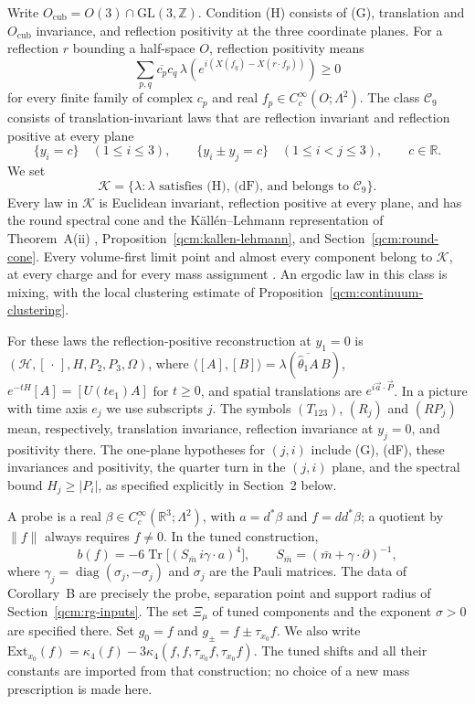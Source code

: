 \documentclass[11pt,letterpaper,reqno]{amsart}
\theoremstyle{definition}
\begin{document}
Write $O_{\mathrm{cub}}=O(3)\cap\mathrm{GL}(3,\mathbb Z)$.
Condition (H) consists of (G), translation and $O_{\mathrm{cub}}$
invariance, and reflection positivity at the three coordinate planes.
For a reflection $r$ bounding a half-space $O$, reflection positivity
means
\begin{equation}\label{qcm:reflection-positivity}
 \sum_{p,q}\overline{c_p}c_q\,
 \lambda\!\left(e^{i(X(f_q)-X(r\cdot f_p))}\right)\ge0
\end{equation}
for every finite family of complex $c_p$ and real
$f_p\in C_c^\infty(O;\Lambda^2)$.
The class $\mathcal C_9$ consists of translation-invariant laws that
are reflection invariant and reflection positive at every plane
\[
 \{y_i=c\}\quad(1\le i\le3),\qquad
 \{y_i\pm y_j=c\}\quad(1\le i<j\le3),\qquad c\in\mathbb R.
\]
We set
\[
\mathcal K=\{\lambda:\lambda\text{ satisfies (H), (dF), and belongs to }\mathcal C_9\}.
\]
Every law in $\mathcal K$ is Euclidean invariant, reflection positive
at every plane, and has the round spectral cone and the
K\"all\'en--Lehmann representation of Theorem~A(ii)
\cite[Propositions~7.1--7.3, Section~7.3, and Theorem~8.6]{QEDConstruction}, Proposition~\ref{qcm:kallen-lehmann}, and Section~\ref{qcm:round-cone}.
Every volume-first limit point and almost every component belong to
$\mathcal K$, at every charge and for every mass assignment
\cite[Section~6, Section~7.5, and Theorem~8.6]{QEDConstruction}. An ergodic law in this class is mixing, with
the local clustering estimate of Proposition~\ref{qcm:continuum-clustering}.

For these laws the reflection-positive reconstruction at $y_1=0$ is
$(\mathcal H,[\,\cdot\,],H,P_2,P_3,\Omega)$, where
$\langle[A],[B]\rangle=\lambda(\overline{\widehat\theta_1A}\,B)$,
$e^{-tH}[A]=[U(te_1)A]$ for $t\ge0$, and spatial translations are
$e^{i\vec a\cdot\vec P}$. In a picture with time axis $e_j$ we use
subscripts $j$. The symbols $(T_{123})$, $(R_j)$ and $(RP_j)$ mean,
respectively, translation invariance, reflection invariance at $y_j=0$,
and positivity there. The one-plane hypotheses for $(j,i)$ include
(G), (dF), these invariances and positivity, the quarter turn in the
$(j,i)$ plane, and the spectral bound $H_j\ge|P_i|$, as specified explicitly in Section~2 below.

A probe is a real $\beta\in C_c^\infty(\mathbb R^3;\Lambda^2)$, with
$a=d^*\beta$ and $f=dd^*\beta$; a quotient by $\|f\|$ always requires
$f\ne0$. In the tuned construction,
\[
b(f)=-6\operatorname{Tr}\bigl[(S_{\bar m}\,i\gamma\cdot a)^4\bigr],
\qquad S_{\bar m}=(\bar m+\gamma\cdot\partial)^{-1},
\]
where $\gamma_j=\operatorname{diag}(\sigma_j,-\sigma_j)$ and $\sigma_j$
are the Pauli matrices. The data of Corollary~B are precisely the probe,
separation point and support radius of Section~\ref{qcm:rg-inputs}.
The set $\Xi_\mu$ of tuned components and the exponent $\sigma>0$ are
specified there. Set $g_0=f$ and $g_\pm=f\pm\tau_{x_0}f$. We also write
$\mathrm{Ext}_{x_0}(f)=\allowbreak \kappa_4(f)-3\kappa_4(f,\allowbreak f,\allowbreak \tau_{x_0}f,\allowbreak \tau_{x_0}f)$.
The tuned shifts and all their constants are imported from that
construction; no choice of a new mass prescription is made here.
\end{document}
